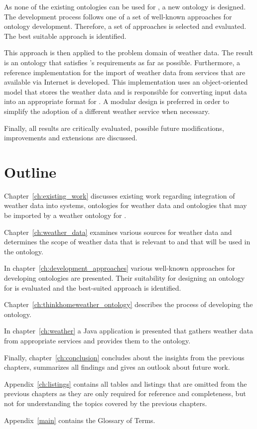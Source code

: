 As none of the existing ontologies can be used for \thinkhome, a new ontology is designed. The development process follows one of a set of well-known approaches for ontology development. Therefore, a set of approaches is selected and evaluated. The best suitable approach is identified.

This approach is then applied to the problem domain of weather data. The result is an ontology that satisfies \thinkhome's requirements as far as possible. Furthermore, a reference implementation for the import of weather data from services that are available via Internet is developed. This implementation uses an object-oriented model that stores the weather data and is responsible for converting input data into an appropriate format for \thinkhome. A modular design is preferred in order to simplify the adoption of a different weather service when necessary.

Finally, all results are critically evaluated, possible future modifications, improvements and extensions are discussed.

\section{Outline}

Chapter~\ref{ch:existing_work} discusses existing work regarding integration of weather data into \smarthome systems, ontologies for weather data and ontologies that may be imported by a weather ontology for \thinkhome.

Chapter~\ref{ch:weather_data} examines various sources for weather data and determines the scope of weather data that is relevant to \thinkhome and that will be used in the ontology.

In chapter~\ref{ch:development_approaches} various well-known approaches for developing ontologies are presented. Their suitability for designing an ontology for \thinkhome is evaluated and the best-suited approach is identified.

Chapter~\ref{ch:thinkhomeweather_ontology} describes the process of developing the ontology.

In chapter~\ref{ch:weather} a Java application is presented that gathers weather data from appropriate services and provides them to the \thinkhome ontology.

Finally, chapter~\ref{ch:conclusion} concludes about the insights from the previous chapters, summarizes all findings and gives an outlook about future work.

Appendix~\ref{ch:listings} contains all tables and listings that are omitted from the previous chapters as they are only required for reference and completeness, but not for understanding the topics covered by the previous chapters.

Appendix~\ref{main} contains the Glossary of Terms.
